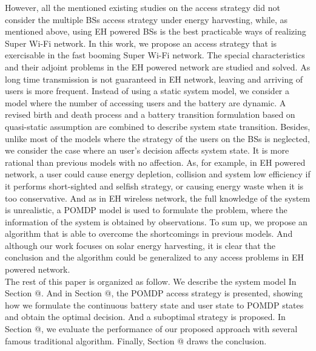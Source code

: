 \documentclass[conference]{IEEEtran}
\makeatletter
\newcommand{\Rmnum}[1]{\expandafter\@slowromancap\romannumeral #1@}
\makeatother
\begin{document}
\indent However, all the mentioned existing studies on the access strategy did not consider the 
multiple BSs access strategy under energy harvesting, while, as mentioned above,
using EH powered BSs is the best practicable ways of realizing Super Wi-Fi network.
In this work, we propose an access strategy that is exercisable in the fast booming Super Wi-Fi network.
The special characteristics and their adjoint problems in the EH powered network are studied and solved.
As long time transmission is not guaranteed in EH network,
leaving and arriving of users is more frequent.
Instead of using a static system model,
we consider a model where the number of accessing users and the battery are dynamic.
A revised birth and death process and a battery transition formulation based on quasi-static assumption
are combined to describe system state transition.
Besides, unlike most of the models where the strategy of the users on the BSs is neglected,
we consider the case where an user's decision affects system state.
It is more rational than previous models with no affection.
As, for example, in EH powered network, a user could cause energy depletion,
collision and system low efficiency if it performs short-sighted and selfish strategy,
or causing energy waste when it is too conservative.
And as in EH wireless network, the full knowledge of the system is unrealistic,
a POMDP model is used to formulate the problem, where the information of the system is obtained by observations.
To sum up, we propose an algorithm that is able to overcome the shortcomings in previous models.
And although our work focuses on solar energy harvesting,
it is clear that the conclusion and the algorithm could be generalized to any access problems in EH powered network.
\\
\indent The rest of this paper is organized as follow.
We describe the system model In Section \Rmnum{2}.
And in Section \Rmnum{3}, the POMDP access strategy is presented,
showing how we formulate the continuous battery state and user state to
POMDP states and obtain the optimal decision. And a suboptimal strategy is proposed.
In Section \Rmnum{4}, we evaluate the performance of our proposed approach with several famous traditional algorithm.
Finally, Section \Rmnum{5} draws the conclusion.
\end{document}
